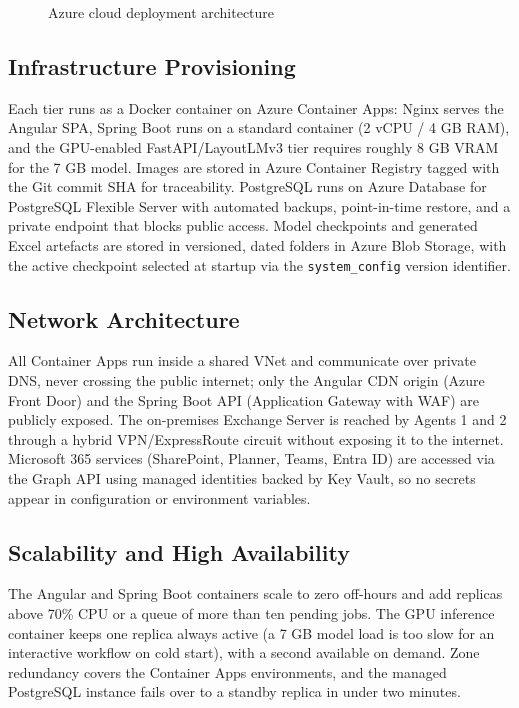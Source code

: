\begin{figure}[H]
  \centering
  \caption{Azure cloud deployment architecture}
  \label{fig:azure-architecture}
\end{figure}

\subsection{Infrastructure Provisioning}

Each tier runs as a Docker container on Azure Container Apps: Nginx serves the Angular SPA, Spring Boot runs on a standard container (2 vCPU / 4 GB RAM), and the GPU-enabled FastAPI/LayoutLMv3 tier requires roughly 8 GB VRAM for the 7 GB model. Images are stored in Azure Container Registry tagged with the Git commit SHA for traceability. PostgreSQL runs on Azure Database for PostgreSQL Flexible Server with automated backups, point-in-time restore, and a private endpoint that blocks public access. Model checkpoints and generated Excel artefacts are stored in versioned, dated folders in Azure Blob Storage, with the active checkpoint selected at startup via the \texttt{system\_config} version identifier.

\subsection{Network Architecture}

All Container Apps run inside a shared VNet and communicate over private DNS, never crossing the public internet; only the Angular CDN origin (Azure Front Door) and the Spring Boot API (Application Gateway with WAF) are publicly exposed. The on-premises Exchange Server is reached by Agents 1 and 2 through a hybrid VPN/ExpressRoute circuit without exposing it to the internet. Microsoft 365 services (SharePoint, Planner, Teams, Entra ID) are accessed via the Graph API using managed identities backed by Key Vault, so no secrets appear in configuration or environment variables.

\subsection{Scalability and High Availability}

The Angular and Spring Boot containers scale to zero off-hours and add replicas above 70\% CPU or a queue of more than ten pending jobs. The GPU inference container keeps one replica always active (a 7 GB model load is too slow for an interactive workflow on cold start), with a second available on demand. Zone redundancy covers the Container Apps environments, and the managed PostgreSQL instance fails over to a standby replica in under two minutes.

